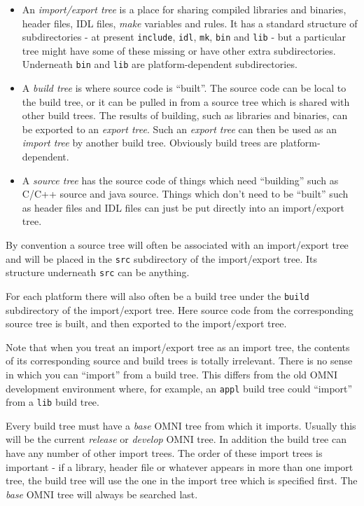 \documentclass[11pt,twoside,onecolumn]{article}
\begin{document}
\begin{itemize}

\item An {\em import/export tree} is a place for sharing compiled libraries and
binaries, header files, IDL files, {\em make} variables and rules.  It has a
standard structure of subdirectories - at present {\tt include}, {\tt idl},
{\tt mk}, {\tt bin} and {\tt lib} - but a particular tree might have some of
these missing or have other extra subdirectories.  Underneath {\tt bin} and
{\tt lib} are platform-dependent subdirectories.

\item A {\em build tree} is where source code is ``built''.  The source code
can be local to the build tree, or it can be pulled in from a source tree which
is shared with other build trees.  The results of building, such as libraries
and binaries, can be exported to an {\em export tree}.  Such an {\em export
tree} can then be used as an {\em import tree} by another build tree.
Obviously build trees are platform-dependent.

\item A {\em source tree} has the source code of things which need ``building''
such as C/C++ source and java source.  Things which don't need to be ``built''
such as header files and IDL files can just be put directly into an
import/export tree.

\end{itemize}

By convention a source tree will often be associated with an import/export
tree and will be placed in the {\tt src} subdirectory of the import/export
tree.  Its structure underneath {\tt src} can be anything.

For each platform there will also often be a build tree under the {\tt build}
subdirectory of the import/export tree.  Here source code from the
corresponding source tree is built, and then exported to the import/export
tree.

Note that when you treat an import/export tree as an import tree, the contents
of its corresponding source and build trees is totally irrelevant.  There is no
sense in which you can ``import'' from a build tree.  This differs from the old
OMNI development environment where, for example, an {\tt appl} build tree could
``import'' from a {\tt lib} build tree.

Every build tree must have a {\em base} OMNI tree from which it imports.
Usually this will be the current {\em release} or {\em develop} OMNI tree.  In
addition the build tree can have any number of other import trees.  The order
of these import trees is important - if a library, header file or whatever
appears in more than one import tree, the build tree will use the one in the
import tree which is specified first.  The {\em base} OMNI tree will always be
searched last.
\end{document}
